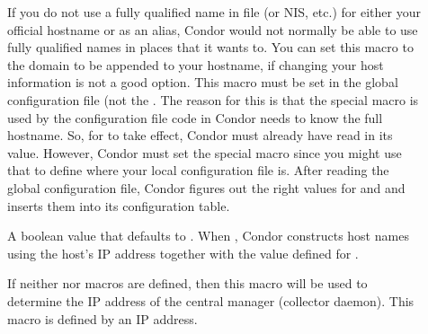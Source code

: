\begin{description}
\item[] \label{param:DefaultDomainName}
  If you do not use a fully qualified name in file 
  (or NIS, etc.) for either your official hostname or as an
  alias, Condor would not normally be able to use fully qualified names
  in places that it wants to.  You can set this macro to the
  domain to be appended to your hostname, if changing your host
  information is not a good option.  This macro must be set in the
  global configuration file (not the .
  The reason for this is that the special 
  macro is used by the configuration file code in Condor needs
  to know the full hostname.  So, for  to
  take effect, Condor must already have read in its value.  However,
  Condor must set the  special macro since you
  might use that to define where your local configuration file is.  After
  reading the global configuration file, Condor figures out the right values
  for  and  and inserts them
  into its configuration table.

\item[] \label{param:NoDNS}
  A boolean value that defaults to .
  When , Condor constructs host names using the host's IP address
  together with the value defined for . 

\item[] \label{param:CMIPAddr}
  If neither  nor 
   macros are defined, then this
  macro will be used to determine the IP address of the central
  manager (collector daemon).
  This macro is defined by an IP address.


\end{description}
